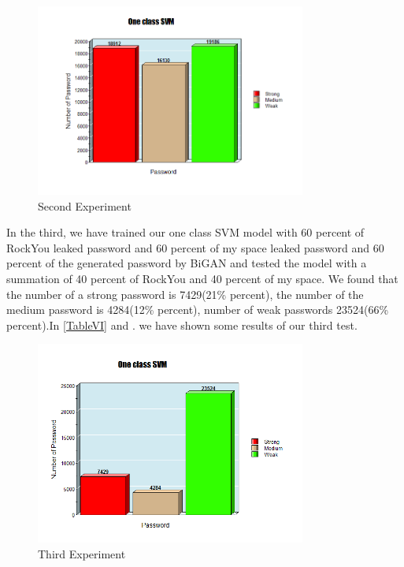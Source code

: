 \documentclass[runningheads]{llncs}
\begin{document}
\begin{figure}[ht!] %
\centering
\includegraphics[width=3.5in]{Secound.png}
\caption{Second Experiment}
\label{Second Experiment}
\end{figure}
\newline
In the third, we have trained our one class SVM model with 60 percent of RockYou leaked password and 60 percent of my space leaked password and 60 percent of the generated password by BiGAN and tested the model with a summation of 40 percent of RockYou and 40 percent of my space. We found that the number of a strong password is 7429(21\% percent), the number of the medium password is 4284(12\% percent), number of weak passwords 23524(66\% percent).In \ref{TableVI} and . we have shown some results of our third test.
\begin{figure}[ht!] %
\centering
\includegraphics[width=3.5in]{Third.png}
\caption{Third Experiment}
\label{Third Experiment}
\end{figure}
\newline
\end{document}
